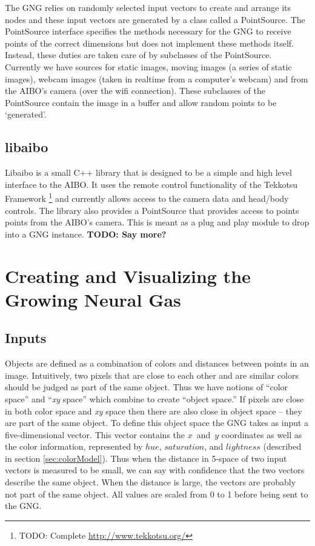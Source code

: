 \documentclass{article}
\renewcommand{\|}{\origbar} %
\newcommand{\xyspace}{{\em xy} space}
\begin{document}
The GNG relies on randomly selected input vectors to create and arrange its nodes and these input vectors are generated by a class called a PointSource. The PointSource interface specifies the methods necessary for the GNG to receive points of the correct dimensions but does not implement these methods itself. Instead, these duties are taken care of by subclasses of the PointSource. Currently we have sources for static images, moving images (a series of static images), webcam images (taken in realtime from a computer's webcam) and from the AIBO's camera (over the wifi connection). These subclasses of the PointSource contain the image in a buffer and allow random points to be `generated'.

\subsection{libaibo}

Libaibo is a small C++ library that is designed to be a simple and high level interface to the AIBO. It uses the remote control functionality of the Tekkotsu Framework \footnote{TODO: Complete \url{http://www.tekkotsu.org/}} and currently allows access to the camera data and head/body controls. The library also provides a PointSource that provides access to points points from the AIBO's camera. This is meant as a plug and play module to drop into a GNG instance. {\bf TODO: Say more?}

\section{Creating and Visualizing the Growing Neural Gas}
\label{sec:creatingGNG}

\subsection{Inputs}

Objects are defined as a combination of colors and distances between points in an image. Intuitively, two pixels that are close to each other and are similar colors should be judged as part of the same object. Thus we have notions of ``color space'' and ``\xyspace'' which combine to create ``object space.'' If pixels are close in both color space and \xyspace{} then there are also close in object space -- they are part of the same object. To define this object space the GNG takes as input a five-dimensional vector. This vector contains the $x$~and~$y$ coordinates as well as the color information, represented by $hue$, $saturation$, and $lightness$ (described in section \ref{sec:colorModel}). Thus when the distance in 5-space of two input vectors is measured to be small, we can say with confidence that the two vectors describe the same object. When the distance is large, the vectors are probably not part of the same object. All values are scaled from 0 to 1 before being sent to the GNG.
\end{document}
